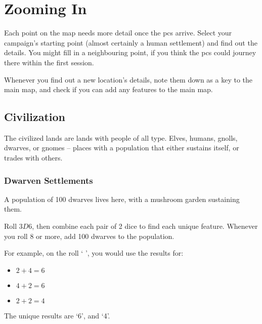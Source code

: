 \section{Zooming In}
\label{mapCharacter}

\begin{multicols}{2}

\noindent
Each point on the map needs more detail once the \glspl{pc} arrive.
Select your campaign's starting point (almost certainly a human settlement) and find out the details.
You might fill in a neighbouring point, if you think the \glspl{pc} could journey there within the first session.

Whenever you find out a new location's details, note them down as a key to the main map, and check if you can add any features to the main map.

\subsection{Civilization}

The civilized lands are lands with people of all type.
Elves, humans, gnolls, dwarves, or gnomes -- places with a population that either sustains itself, or trades with others.

\subsubsection{Dwarven Settlements}
\label{dwarvesPoint}

A population of 100 dwarves lives here, with a mushroom garden sustaining them.

Roll $3D6$, then combine each pair of 2 dice to find each unique feature.
Whenever you roll 8 or more, add 100 dwarves to the population.

\begin{exampletext}
  For example, on the roll `  ', you would use the results for:

  \begin{itemize}
    \item
    $2+4 = 6$
    \item
    $4+2 = 6$
    \item
    $2+2 = 4$
  \end{itemize}

  The unique results are `6', and `4'.
\end{exampletext}


\end{multicols}
